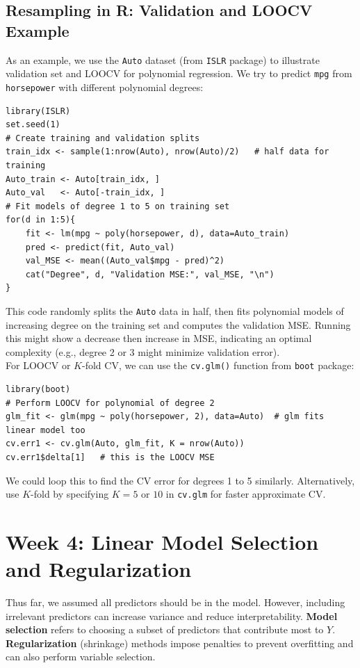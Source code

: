 \documentclass[11pt]{article}
\begin{document}
\subsection{Resampling in R: Validation and LOOCV Example}
As an example, we use the \texttt{Auto} dataset (from \texttt{ISLR} package) to illustrate validation set and LOOCV for polynomial regression. We try to predict \texttt{mpg} from \texttt{horsepower} with different polynomial degrees:
\begin{verbatim}
library(ISLR)
set.seed(1)
# Create training and validation splits
train_idx <- sample(1:nrow(Auto), nrow(Auto)/2)   # half data for training
Auto_train <- Auto[train_idx, ]
Auto_val   <- Auto[-train_idx, ]
# Fit models of degree 1 to 5 on training set
for(d in 1:5){
    fit <- lm(mpg ~ poly(horsepower, d), data=Auto_train)
    pred <- predict(fit, Auto_val)
    val_MSE <- mean((Auto_val$mpg - pred)^2)
    cat("Degree", d, "Validation MSE:", val_MSE, "\n")
}
\end{verbatim}
This code randomly splits the \texttt{Auto} data in half, then fits polynomial models of increasing degree on the training set and computes the validation MSE. Running this might show a decrease then increase in MSE, indicating an optimal complexity (e.g., degree 2 or 3 might minimize validation error). \\

\noindent For LOOCV or $K$-fold CV, we can use the \texttt{cv.glm()} function from \texttt{boot} package:
\begin{verbatim}
library(boot)
# Perform LOOCV for polynomial of degree 2
glm_fit <- glm(mpg ~ poly(horsepower, 2), data=Auto)  # glm fits linear model too
cv.err1 <- cv.glm(Auto, glm_fit, K = nrow(Auto))
cv.err1$delta[1]   # this is the LOOCV MSE
\end{verbatim}
We could loop this to find the CV error for degrees 1 to 5 similarly. Alternatively, use $K$-fold by specifying $K=5$ or $10$ in \texttt{cv.glm} for faster approximate CV.

\section{Week 4: Linear Model Selection and Regularization}
Thus far, we assumed all predictors should be in the model. However, including irrelevant predictors can increase variance and reduce interpretability. \textbf{Model selection} refers to choosing a subset of predictors that contribute most to $Y$. \textbf{Regularization} (shrinkage) methods impose penalties to prevent overfitting and can also perform variable selection.
\end{document}

